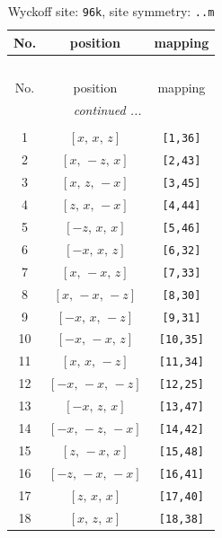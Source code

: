 \documentclass[fleqn,8pt]{jsarticle}
\begin{document}
\begin{longtable}{ccc}
\caption{Wyckoff site: {\tt 96k}, site symmetry: {\tt ..m}}
 \\
 \hline \hline
No. & position & mapping \\ \hline \endfirsthead

\multicolumn{2}{l}{\tablename\ \thetable{}} \\
 \hline \hline
No. & position & mapping \\ \hline \endhead

 \hline \hline
\multicolumn{2}{r}{\footnotesize\it continued ...} \\ \endfoot

 \hline \hline
\multicolumn{2}{r}{} \\ \endlastfoot

1 & $\left[ x,\, x,\, z \right]$ & {\tt [1,36]} \\ \hline
2 & $\left[ x,\, - z,\, x \right]$ & {\tt [2,43]} \\ \hline
3 & $\left[ x,\, z,\, - x \right]$ & {\tt [3,45]} \\ \hline
4 & $\left[ z,\, x,\, - x \right]$ & {\tt [4,44]} \\ \hline
5 & $\left[ - z,\, x,\, x \right]$ & {\tt [5,46]} \\ \hline
6 & $\left[ - x,\, x,\, z \right]$ & {\tt [6,32]} \\ \hline
7 & $\left[ x,\, - x,\, z \right]$ & {\tt [7,33]} \\ \hline
8 & $\left[ x,\, - x,\, - z \right]$ & {\tt [8,30]} \\ \hline
9 & $\left[ - x,\, x,\, - z \right]$ & {\tt [9,31]} \\ \hline
10 & $\left[ - x,\, - x,\, z \right]$ & {\tt [10,35]} \\ \hline
11 & $\left[ x,\, x,\, - z \right]$ & {\tt [11,34]} \\ \hline
12 & $\left[ - x,\, - x,\, - z \right]$ & {\tt [12,25]} \\ \hline
13 & $\left[ - x,\, z,\, x \right]$ & {\tt [13,47]} \\ \hline
14 & $\left[ - x,\, - z,\, - x \right]$ & {\tt [14,42]} \\ \hline
15 & $\left[ z,\, - x,\, x \right]$ & {\tt [15,48]} \\ \hline
16 & $\left[ - z,\, - x,\, - x \right]$ & {\tt [16,41]} \\ \hline
17 & $\left[ z,\, x,\, x \right]$ & {\tt [17,40]} \\ \hline
18 & $\left[ x,\, z,\, x \right]$ & {\tt [18,38]} \\ \hline

\end{longtable}
\end{document}
